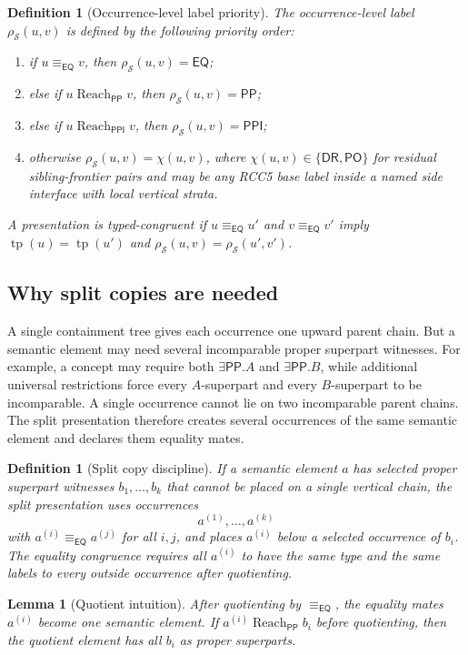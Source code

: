 \documentclass[11pt]{article}
\newtheorem{lemma}[theorem]{Lemma}
\newtheorem{definition}[theorem]{Definition}
\newcommand{\EQ}{\mathsf{EQ}}
\newcommand{\DR}{\mathsf{DR}}
\newcommand{\PO}{\mathsf{PO}}
\newcommand{\PP}{\mathsf{PP}}
\newcommand{\PPI}{\mathsf{PPI}}
\newcommand{\typ}{\operatorname{tp}}
\newcommand{\eqc}{\equiv_{\EQ}}
\newcommand{\reach}{\operatorname{Reach}}
\begin{document}
\begin{definition}[Occurrence-level label priority]\label{def:priority-label}
The occurrence-level label $\rho_\mathcal S(u,v)$ is defined by the following priority order:
\begin{enumerate}[label=(L\arabic*)]
\item if $u\eqc v$, then $\rho_\mathcal S(u,v)=\EQ$;
\item else if $u\reach_\PP v$, then $\rho_\mathcal S(u,v)=\PP$;
\item else if $u\reach_\PPI v$, then $\rho_\mathcal S(u,v)=\PPI$;
\item otherwise $\rho_\mathcal S(u,v)=\chi(u,v)$, where $\chi(u,v)\in\{\DR,\PO\}$ for residual sibling-frontier pairs and may be any RCC5 base label inside a named side interface with local vertical strata.
\end{enumerate}
A presentation is typed-congruent if $u\eqc u'$ and $v\eqc v'$ imply $\typ(u)=\typ(u')$ and $\rho_\mathcal S(u,v)=\rho_\mathcal S(u',v')$.
\end{definition}

\subsection{Why split copies are needed}

A single containment tree gives each occurrence one upward parent chain.  But a semantic element may need several incomparable proper superpart witnesses.  For example, a concept may require both $\exists\PP.A$ and $\exists\PP.B$, while additional universal restrictions force every $A$-superpart and every $B$-superpart to be incomparable.  A single occurrence cannot lie on two incomparable parent chains.  The split presentation therefore creates several occurrences of the same semantic element and declares them equality mates.

\begin{definition}[Split copy discipline]\label{def:split-copy}
If a semantic element $a$ has selected proper superpart witnesses $b_1,\ldots,b_k$ that cannot be placed on a single vertical chain, the split presentation uses occurrences
\[
  a^{(1)},\ldots,a^{(k)}
\]
with $a^{(i)}\eqc a^{(j)}$ for all $i,j$, and places $a^{(i)}$ below a selected occurrence of $b_i$.  The equality congruence requires all $a^{(i)}$ to have the same type and the same labels to every outside occurrence after quotienting.
\end{definition}

\begin{lemma}[Quotient intuition]\label{lem:split-copy-intuition}
After quotienting by $\eqc$, the equality mates $a^{(i)}$ become one semantic element.  If $a^{(i)}\reach_\PP b_i$ before quotienting, then the quotient element has all $b_i$ as proper superparts.
\end{lemma}
\end{document}
